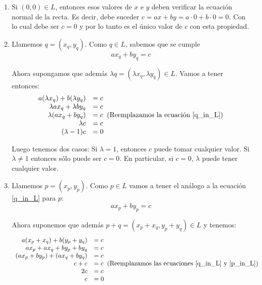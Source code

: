 \begin{enumerate}[resume,topsep=6pt, itemsep=.4cm]
\rta 

\begin{enumerate}
 \item Si $(0,0) \in L$, entonces esos valores de $x$ e $y$ deben verificar la ecuación normal de la recta. Es decir, debe suceder $c = ax + by = a\cdot 0 + b \cdot 0 = 0$. Con lo cual debe ser $c=0$ y por lo tanto es el único valor de $c$ con esta propiedad.

 \item Llamemos $q=(x_q , y_q)$. Como $q \in L$, sabemos que se cumple 
\begin{equation}\label{q_in_L}
a x_q + b y_q = c
\end{equation} 

Ahora supongamos que además $ \lambda q = (\lambda x_q, \lambda y_q) \in L$. Vamos a tener entonces:
\begin{equation*}
\begin{array}{rl}
a (\lambda x_q ) + b (\lambda y_q) &= c \\
\lambda a x_q  + \lambda b y_q &= c \\
\lambda ( a x_q  + b y_q ) &= c \; \; \text{(Reemplazamos la ecuación \ref{q_in_L})}\\
\lambda c &= c \\
(\lambda -1 ) c &= 0
\end{array}
\end{equation*}

Luego tenemos dos casos: Si $\lambda = 1$, entonces $c$ puede tomar cualquier valor. Si $\lambda \neq 1$ entonces sólo puede ser $c=0$. En particular, si $c=0$, $\lambda$ puede tener cualquier valor.
 
 \item Llamemos $p=(x_p,y_p)$. Como $p \in L$ vamos a tener el análogo a la ecuación \ref{q_in_L} para $p$:
\begin{equation}\label{p_in_L}
a x_p + b y_p = c
\end{equation} 

Ahora suponemos que además $p+q = (x_p + x_q,y_p + y_q) \in L$ y tenemos:
\begin{equation*}
\begin{array}{rl}
a (x_p + x_q ) + b (y_p + y_q) &= c \\
a x_p + a x_q + b y_p + b y_q &= c \\
(a x_p + b y_p) + (a x_q + b y_q) &= c \\
c + c &= c \; \; \text{(Reemplazamos las ecuaciones \ref{q_in_L} y \ref{p_in_L})}\\
2 c &= c \\
c &= 0
\end{array}
\end{equation*}


\end{enumerate}
\end{enumerate}
